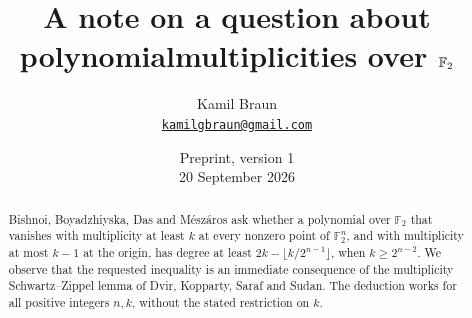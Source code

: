 \documentclass[11pt]{article}
\title{A note on a question about polynomial\nobreakspace multiplicities over \(\F_2\)}
\author{Kamil Braun\\
\href{mailto:kamilgbraun@gmail.com}{\texttt{kamilgbraun@gmail.com}}}
\date{Preprint, version 1\\20 September 2026}
\newcommand{\F}{\mathbb F}
\begin{document}
\maketitle
\begin{abstract}
Bishnoi, Boyadzhiyska, Das and M\'esz\'aros ask whether a polynomial over
\(\F_2\) that vanishes with multiplicity at least \(k\) at every nonzero
point of \(\F_2^n\), and with multiplicity at most \(k-1\) at the origin,
has degree at least \(2k-\lfloor k/2^{n-1}\rfloor\), when
\(k\ge 2^{n-2}\). We observe that the requested inequality is an immediate
consequence of the multiplicity Schwartz--Zippel lemma of Dvir, Kopparty,
Saraf and Sudan. The deduction works for all positive integers \(n,k\),
without the stated restriction on \(k\).
\end{abstract}



\end{document}
